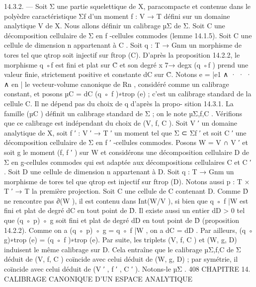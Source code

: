 \documentclass[
  10pt,
]{article}
\newenvironment{Shaded}{}{}
\newcommand{\NormalTok}[1]{#1}
\begin{document}
\begin{Shaded}
\begin{Highlighting}[]
\NormalTok{14.3.2. — Soit Σ une partie squelettique de X, paracompacte et contenue dans le}
\NormalTok{polyèdre caractéristique Σf d’un moment f : V → T défini sur un domaine analytique V}
\NormalTok{de X. Nous allons définir un calibrage µΣ de Σ.}
\NormalTok{   Soit C une décomposition cellulaire de Σ en f {-}cellules commodes (lemme 14.1.5).}
\NormalTok{Soit C une cellule de dimension n appartenant à C . Soit q : T → Gnm un morphisme de}
\NormalTok{tores tel que qtrop soit injectif sur ftrop (C). D’après la proposition 14.2.2, le morphisme}
\NormalTok{q ◦f est fini et plat sur C̊ et son degré x 7→ degx (q ◦f ) prend une valeur finie, strictement}
\NormalTok{positive et constante dC sur C̊. Notons e = |e1 ∧ · · · ∧ en | le vecteur{-}volume canonique}
\NormalTok{de Rn , considéré comme un calibrage constant, et posons µC = dC (q ◦ f )∗trop (e) ; c’est}
\NormalTok{un calibrage standard de la cellule C. Il ne dépend pas du choix de q d’après la propo{-}}
\NormalTok{sition 14.3.1. La famille (µC ) définit un calibrage standard de Σ ; on le note µΣ,f,C .}
\NormalTok{   Vérifions que ce calibrage est indépendant du choix de (V, f, C ).}
\NormalTok{   Soit V ′ un domaine analytique de X, soit f ′ : V ′ → T ′ un moment tel que Σ ⊂ Σf ′ et}
\NormalTok{soit C ′ une décomposition cellulaire de Σ en f ′ {-}cellules commodes. Posons W = V ∩ V ′}
\NormalTok{et soit g le moment (f, f ′ ) sur W et considérons une décomposition cellulaire D de Σ en}
\NormalTok{g{-}cellules commodes qui est adaptée aux décompositions cellulaires C et C ′ .}
\NormalTok{   Soit D une cellule de dimension n appartenant à D. Soit q : T → Gnm un morphisme}
\NormalTok{de tores tel que qtrop est injectif sur ftrop (D). Notons aussi p : T × T ′ → T la première}
\NormalTok{projection.}
\NormalTok{   Soit C une cellule de C contenant D. Comme D̊ ne rencontre pas ∂(W ), il est contenu}
\NormalTok{dans Int(W/V ), si bien que q ◦ f |W est fini et plat de degré dC en tout point de D̊. Il}
\NormalTok{existe aussi un entier dD \textgreater{} 0 tel que (q ◦ p) ◦ g soit fini et plat de degré dD en tout point}
\NormalTok{de D̊ (proposition 14.2.2). Comme on a (q ◦ p) ◦ g = q ◦ f |W , on a dC = dD . Par ailleurs,}
\NormalTok{(q ◦ g)∗trop (e) = (q ◦ f )∗trop (e). Par suite, les triplets (V, f, C ) et (W, g, D) induisent le}
\NormalTok{même calibrage sur D.}
\NormalTok{   Cela entraîne que le calibrage µΣ,f,C de Σ déduit de (V, f, C ) coïncide avec celui déduit}
\NormalTok{de (W, g, D) ; par symétrie, il coïncide avec celui déduit de (V ′ , f ′ , C ′ ). Notons{-}le µΣ .}
\NormalTok{408          CHAPITRE 14. CALIBRAGE CANONIQUE D’UN ESPACE ANALYTIQUE}


\end{Highlighting}
\end{Shaded}
\end{document}
